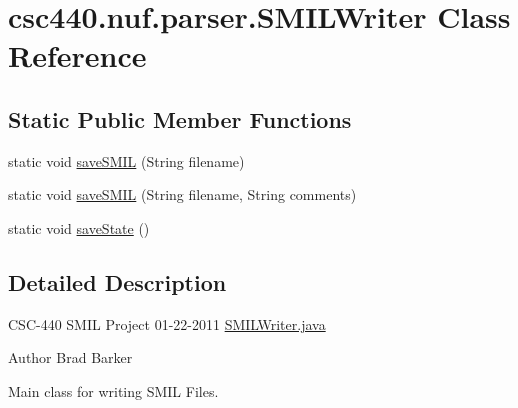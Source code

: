 \hypertarget{classcsc440_1_1nuf_1_1parser_1_1_s_m_i_l_writer}{\section{csc440.\-nuf.\-parser.\-S\-M\-I\-L\-Writer Class Reference}
\label{classcsc440_1_1nuf_1_1parser_1_1_s_m_i_l_writer}
}
\subsection*{Static Public Member Functions}
\begin{DoxyCompactItemize}
\item 
static void \hyperlink{classcsc440_1_1nuf_1_1parser_1_1_s_m_i_l_writer_a52edc2f5797769f5cc250c56a0fd05c6}{save\-S\-M\-I\-L} (String filename)
\item 
static void \hyperlink{classcsc440_1_1nuf_1_1parser_1_1_s_m_i_l_writer_a392dc47401bcb619cbc06db1a78d794b}{save\-S\-M\-I\-L} (String filename, String comments)
\item 
static void \hyperlink{classcsc440_1_1nuf_1_1parser_1_1_s_m_i_l_writer_a2c1cc326dbdbbfbad1bf472b24166555}{save\-State} ()
\end{DoxyCompactItemize}


\subsection{Detailed Description}
C\-S\-C-\/440 S\-M\-I\-L Project 01-\/22-\/2011 \hyperlink{_s_m_i_l_writer_8java}{S\-M\-I\-L\-Writer.\-java} \begin{DoxyAuthor}{Author}
Brad Barker
\end{DoxyAuthor}
Main class for writing S\-M\-I\-L Files. 

